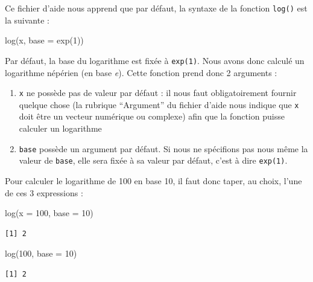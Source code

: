 \documentclass[
  a4paper,
  DIV=11,
  numbers=noendperiod,
  oneside]{scrreprt}
\newenvironment{Shaded}{}{}
\newcommand{\AttributeTok}[1]{\textcolor[rgb]{0.84,0.23,0.29}{#1}}
\newcommand{\DecValTok}[1]{\textcolor[rgb]{0.00,0.36,0.77}{#1}}
\newcommand{\FunctionTok}[1]{\textcolor[rgb]{0.44,0.26,0.76}{#1}}
\newcommand{\NormalTok}[1]{\textcolor[rgb]{0.14,0.16,0.18}{#1}}
\providecommand{\tightlist}{%
  \setlength{\itemsep}{0pt}\setlength{\parskip}{0pt}}\usepackage{longtable,booktabs,array}
\begin{document}
Ce fichier d'aide nous apprend que par défaut, la syntaxe de la fonction
\texttt{log()} est la suivante :

\begin{Shaded}
\begin{Highlighting}[]
\FunctionTok{log}\NormalTok{(x, }\AttributeTok{base =} \FunctionTok{exp}\NormalTok{(}\DecValTok{1}\NormalTok{))}
\end{Highlighting}
\end{Shaded}

Par défaut, la base du logarithme est fixée à \texttt{exp(1)}. Nous
avons donc calculé un logarithme népérien (en base \emph{e}). Cette
fonction prend donc 2 arguments :

\begin{enumerate}
\def\labelenumi{\arabic{enumi}.}
\tightlist
\item
  \texttt{x} ne possède pas de valeur par défaut : il nous faut
  obligatoirement fournir quelque chose (la rubrique ``Argument'' du
  fichier d'aide nous indique que \texttt{x} doit être un vecteur
  numérique ou complexe) afin que la fonction puisse calculer un
  logarithme
\item
  \texttt{base} possède un argument par défaut. Si nous ne spécifions
  pas nous même la valeur de \texttt{base}, elle sera fixée à sa valeur
  par défaut, c'est à dire \texttt{exp(1)}.
\end{enumerate}

Pour calculer le logarithme de 100 en base 10, il faut donc taper, au
choix, l'une de ces 3 expressions :

\begin{Shaded}
\begin{Highlighting}[]
\FunctionTok{log}\NormalTok{(}\AttributeTok{x =} \DecValTok{100}\NormalTok{, }\AttributeTok{base =} \DecValTok{10}\NormalTok{)}
\end{Highlighting}
\end{Shaded}

\begin{verbatim}
[1] 2
\end{verbatim}

\begin{Shaded}
\begin{Highlighting}[]
\FunctionTok{log}\NormalTok{(}\DecValTok{100}\NormalTok{, }\AttributeTok{base =} \DecValTok{10}\NormalTok{)}
\end{Highlighting}
\end{Shaded}

\begin{verbatim}
[1] 2
\end{verbatim}
\end{document}
